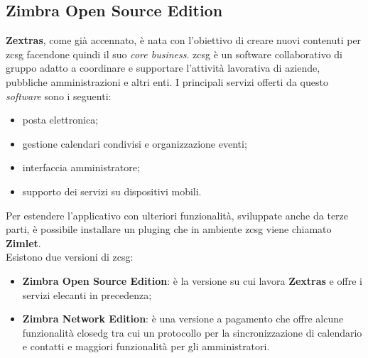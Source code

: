     \subsection{Zimbra Open Source Edition}
        \textbf{Zextras}, come già accennato, è nata con l'obiettivo di creare nuovi contenuti per \gls{zcsg} facendone quindi il suo \textit{core business}.
        \gls{zcsg} è un software collaborativo di gruppo adatto a coordinare e supportare l'attività lavorativa di aziende, pubbliche amministrazioni e altri enti. I principali servizi offerti da questo \textit{software} sono i seguenti:
        \begin{itemize}
            \item posta elettronica;
            \item gestione calendari condivisi e organizzazione eventi;
            \item interfaccia amministratore;
            \item supporto dei servizi su dispositivi mobili.
        \end{itemize}
        Per estendere l'applicativo con ulteriori funzionalità, sviluppate anche da terze parti, è possibile installare un \gls{pluging} che in ambiente \gls{zcsg} viene chiamato \textbf{Zimlet}. \\
        Esistono due versioni di \gls{zcsg}:
        \begin{itemize}
            \setlength\itemsep{0em}
            \item \textbf{Zimbra Open Source Edition}: è la versione su cui lavora \textbf{Zextras} e offre i servizi elecanti in precedenza;
            \item \textbf{Zimbra Network Edition}: è una versione a pagamento che offre alcune funzionalità \gls{closedg} tra cui un protocollo per la sincronizzazione di calendario e contatti e maggiori funzionalità per gli amministratori.
        \end{itemize}
        
